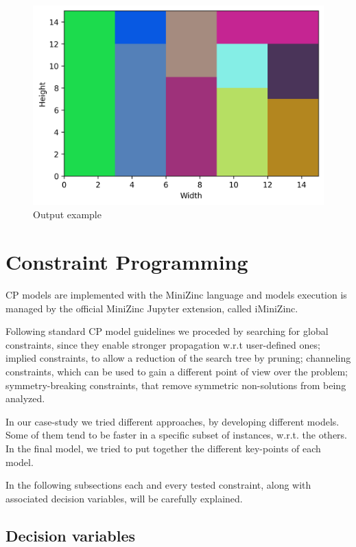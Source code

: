 \documentclass[a4paper,10pt]{article}
\begin{document}
\begin{figure}[H]
   \centering
   \includegraphics[scale=0.8]{output.png}
   \caption{Output example}
   \label{fig:output}
\end{figure}

\newpage

\section{Constraint Programming} \label{sec:cp}
CP models are implemented with the MiniZinc language and models execution is managed by the official MiniZinc Jupyter extension, called iMiniZinc.

Following standard CP model guidelines we proceded by searching for global constraints, since they enable stronger propagation w.r.t user-defined ones; implied constraints, to allow a reduction of the search tree by pruning; channeling constraints, which can be used to gain a different point of view over the problem; symmetry-breaking constraints, that remove symmetric non-solutions from being analyzed.

In our case-study we tried different approaches, by developing different models. Some of them tend to be faster in a specific subset of instances, w.r.t. the others. In the final model, we tried to put together the different key-points of each model.

In the following subsections each and every tested constraint, along with associated decision variables, will be carefully explained.

\subsection{Decision variables} \label{sec:cp-variables}
\end{document}
